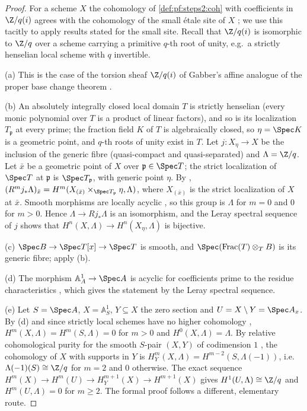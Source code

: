 \begin{proof}
For a scheme $X$ the cohomology of \cref{def:pf:steps2:coh} with coefficients in $\Z/q(i)$ agrees with
the cohomology of the small \'etale site of $X$ \cite[Ch.~III, \S3]{Milne1980}; we use this
tacitly to apply results stated for the small site. Recall that $\Z/q(i)$ is isomorphic to $\Z/q$ over
a scheme carrying a primitive $q$-th root of unity, e.g.\ a strictly henselian local scheme with $q$
invertible.

(a) This is the case of the torsion sheaf $\Z/q(i)$ of Gabber's affine analogue of the proper base
change theorem \cite[Thm.~1]{Gabber1994}.

(b) An absolutely integrally closed local domain $T$ is strictly henselian (every monic polynomial over
$T$ is a product of linear factors), and so is its localization $T_{\mathfrak p}$ at every prime;
the fraction field $K$ of $T$ is algebraically closed, so $\eta=\Spec K$ is a geometric point, and
$q$-th roots of unity exist in $T$. Let $j\colon X_\eta\to X$ be the inclusion of the generic fibre
(quasi-compact and quasi-separated) and $\Lambda=\Z/q$. Let $\bar x$ be a geometric point of $X$
over $\mathfrak p\in\Spec T$; the strict localization of $\Spec T$ at $\mathfrak p$ is
$\Spec T_{\mathfrak p}$, with generic point $\eta$. By \cite[Exp.~VIII, 5.2]{ArtinGrothendieckVerdier1972},
$(R^mj_\ast\Lambda)_{\bar x}=H^m(X_{(\bar x)}\times_{\Spec T_{\mathfrak p}}\eta,\Lambda)$, where
$X_{(\bar x)}$ is the strict localization of $X$ at $\bar x$. Smooth morphisms are locally acyclic
\cite[Exp.~XV, 2.1]{ArtinGrothendieckVerdier1972}, so this group is $\Lambda$ for $m=0$ and $0$ for
$m>0$. Hence $\Lambda\to Rj_\ast\Lambda$ is an isomorphism, and the Leray spectral sequence of $j$
shows that $H^n(X,\Lambda)\to H^n(X_\eta,\Lambda)$ is bijective.

(c) $\Spec B\to\Spec T[x]\to\Spec T$ is smooth, and $\Spec(\mathrm{Frac}(T)\otimes_TB)$ is its generic
fibre; apply (b).

(d) The morphism $\mathbb A^1_A\to\Spec A$ is acyclic for coefficients prime to the residue
characteristics \cite[Exp.~XV, 2.2]{ArtinGrothendieckVerdier1972}, which gives the statement by the
Leray spectral sequence.

(e) Let $S=\Spec A$, $X=\mathbb A^1_S$, $Y\subseteq X$ the zero section and $U=X\setminus Y=\Spec A_x$.
By (d) and since strictly local schemes have no higher cohomology
\cite[Exp.~VIII, 4.7]{ArtinGrothendieckVerdier1972}, $H^m(X,\Lambda)=H^m(S,\Lambda)=0$ for $m>0$ and
$H^0(X,\Lambda)=\Lambda$. By relative cohomological purity for the smooth $S$-pair $(X,Y)$ of
codimension $1$ \cite[Exp.~XVI, 3.7]{ArtinGrothendieckVerdier1972}, the cohomology of $X$ with supports
in $Y$ is $H^m_Y(X,\Lambda)=H^{m-2}(S,\Lambda(-1))$, i.e.\ $\Lambda(-1)(S)\cong\Z/q$ for $m=2$ and $0$
otherwise. The exact sequence $H^m(X)\to H^m(U)\to H^{m+1}_Y(X)\to H^{m+1}(X)$ gives
$H^1(U,\Lambda)\cong\Z/q$ and $H^m(U,\Lambda)=0$ for $m\ge2$. The formal proof follows a different,
elementary route.


\end{proof}
